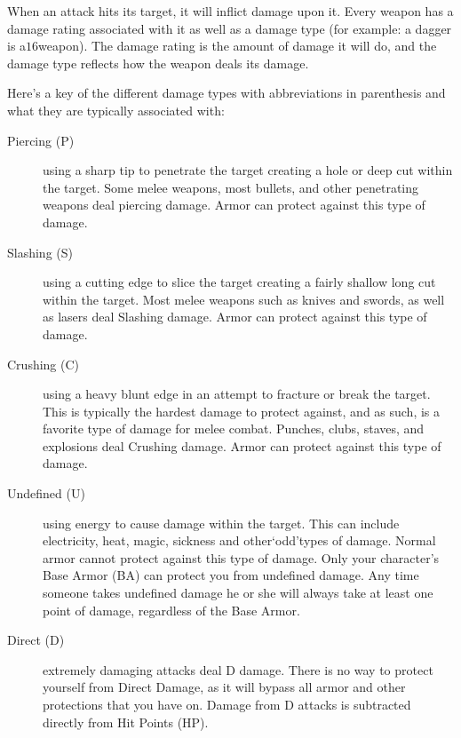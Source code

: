 \documentclass[twoside]{book}
\begin{document}
    {  
    When an attack hits its target, it will inflict damage upon it. Every weapon has a damage rating associated with it as well as a damage type (for example: a dagger is a\ensuremath{1}\ensuremath{6}\ensuremath{}weapon). The damage rating is the amount of damage it will do, and the damage type reflects how the weapon deals its damage.
    }
  
    {  
    Here's a key of the different damage types with abbreviations in parenthesis and what they are typically associated with:
    }
  
\begin{description}
    
  \item[Piercing (P)] 
    {  
    using a sharp tip to penetrate the target creating a hole or deep cut within the target. Some melee weapons, most bullets, and other penetrating weapons deal piercing damage. Armor can protect against this type of damage.
    }
  
  \item[Slashing (S)] 
    {  
    using a cutting edge to slice the target creating a fairly shallow long cut within the target. Most melee weapons such as knives and swords, as well as lasers deal Slashing damage. Armor can protect against this type of damage.
    }
  
  \item[Crushing (C)] 
    {  
    using a heavy blunt edge in an attempt to fracture or break the target. This is typically the hardest damage to protect against, and as such, is a favorite type of damage for melee combat. Punches, clubs, staves, and explosions deal Crushing damage. Armor can protect against this type of damage.
    }
  
  \item[Undefined (U)] 
    {  
    using energy to cause damage within the target. This can include electricity, heat, magic, sickness and other`odd'types of damage. Normal armor cannot protect against this type of damage. Only your character's Base Armor (BA) can protect you from undefined damage. Any time someone takes undefined damage he or she will always take at least one point of damage, regardless of the Base Armor.
    }
  
  \item[Direct (D)] 
    {  
    extremely damaging attacks deal D damage. There is no way to protect yourself from Direct Damage, as it will bypass all armor and other protections that you have on. Damage from D attacks is subtracted directly from Hit Points (HP).
    }
  
\end{description}
  
\end{document}
